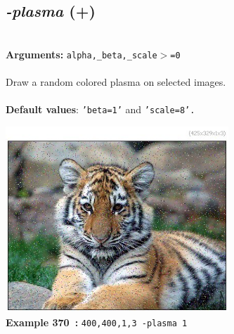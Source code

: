 \documentclass[a4paper,11pt,twoside]{book}
\begin{document}
\subsection{\emph{-plasma} (+)}\vspace*{-0.5em}
~\\\textbf{Arguments: } 
{\small \texttt{alpha,\_beta,\_scale$>$=0}}\\~\\
Draw a random colored plasma on selected images.
~\\~\\\textbf{Default values}: {\small \texttt{'beta=1'} and \texttt{'scale=8'.}}
\begin{center}\includegraphics[keepaspectratio=true,height=7cm,width=\textwidth]{img/gmic_def370.jpg}\\
{\footnotesize \textbf{Example 370~:} \texttt{400,400,1,3 -plasma 1}}
\end{center}
\end{document}
